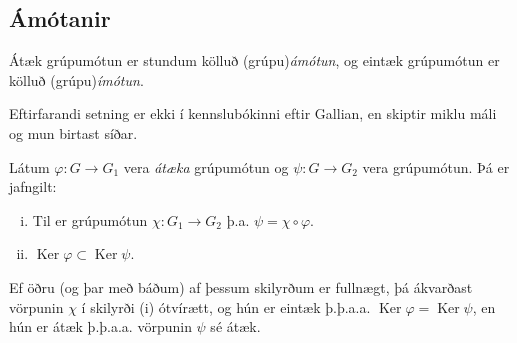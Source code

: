 \documentclass[a4paper,icelandic,11pt]{book}
\theoremstyle{plain}
\DeclareMathOperator{\Ker}{Ker} %
\begin{document}
\subsection{Ámótanir}
\begin{skilgr}
  Átæk grúpumótun er stundum kölluð
  (grúpu)\emph{ámótun},
  og eintæk grúpumótun er kölluð
  (grúpu)\emph{ímótun}.
\end{skilgr}

Eftirfarandi setning er ekki í kennslubókinni eftir Gallian, en skiptir miklu
máli og mun birtast síðar.

\begin{setn}
  [Ámótunarsetningin] \label{setn:amotun}
  Látum $\varphi:G\to G_1$ vera \emph{átæka} grúpumótun og $\psi:G\to G_2$ vera
  grúpumótun. Þá er jafngilt:
  \begin{enumerate}[(i)]
    \item Til er grúpumótun $\chi: G_1\to G_2$ þ.a. $\psi = \chi\circ\varphi$.
    \item $\Ker\varphi\subset \Ker\psi$.
  \end{enumerate}
  Ef öðru (og þar með báðum) af þessum skilyrðum er fullnægt, þá ákvarðast
  vörpunin $\chi$ í skilyrði (i) ótvírætt, og hún er eintæk þ.þ.a.a.
  $\Ker\varphi = \Ker\psi$, en hún er átæk þ.þ.a.a. vörpunin $\psi$ sé átæk.
\end{setn}
\end{document}
